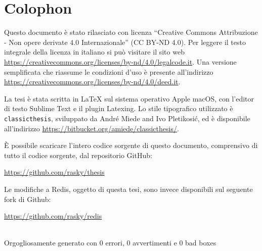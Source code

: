 \pagestyle{empty}

\hfill

\vfill


\section*{Colophon}

Questo documento è stato rilasciato con licenza ``Creative Commons Attribuzione
- Non opere derivate 4.0 Internazionale'' (CC BY-ND 4.0). Per leggere il testo
integrale della licenza in italiano si può visitare il sito web
\url{https://creativecommons.org/licenses/by-nd/4.0/legalcode.it}. Una versione
semplificata che riassume le condizioni d'uso è presente all'indirizzo
\url{https://creativecommons.org/licenses/by-nd/4.0/deed.it}.

La tesi è stata scritta in \LaTeX{} sul sistema operativo Apple macOS, con
l'editor di testo Sublime Text e il plugin Latexing. Lo stile tipografico
utilizzato è \texttt{classicthesis}, sviluppato da Andr\'e Miede and Ivo
Pletikosić, ed è disponibile all'indirizzo
\url{https://bitbucket.org/amiede/classicthesis/}.

È possibile scaricare l'intero codice sorgente di questo documento, comprensivo 
di tutto il codice sorgente, dal repositorio GitHub:
\begin{center}
\url{https://github.com/rasky/thesis}
\end{center}

Le modifiche a Redis, oggetto di questa tesi, sono invece disponibili sul 
seguente fork di Github:
\begin{center}
\url{https://github.com/rasky/redis}
\end{center}

\bigskip
\bigskip

\footnotesize
\noindent\finalVersionString \\
\noindent Orgogliosamente generato con $0$ errori, $0$ avvertimenti e $0$ bad boxes


